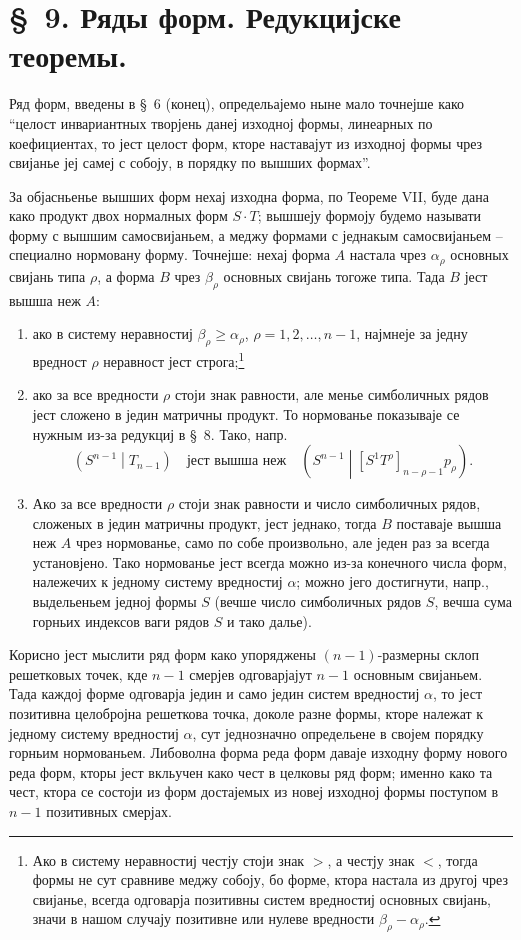 ﻿\documentclass[11pt]{article}
\newcommand{\pair}[2]{\left(#1\middle|#2\right)}
\begin{document}
\section*{\S\ 9. Ряды форм. Редукцијске теоремы.}

Ряд форм, введены в \S\ 6 (конец), определьајемо ныне мало точнејше како ``целост инвариантных творјень данеј изходној формы, линеарных по коефициентах, то јест целост форм, кторе наставајут из изходној формы чрез свијанье јеј самеј с собоју, в порядку по вышших формах''.

За објасньенье вышших форм нехај изходна форма, по Теореме VII, буде дана како продукт двох нормалных форм $S\cdot T$; вышшеју формоју будемо называти форму с вышшим самосвијаньем, а меджу формами с једнакым самосвијаньем -- специално нормовану форму. Точнејше: нехај форма $A$ настала чрез $\alpha_\rho$ основных свијань типа $\rho$, а форма $B$ чрез $\beta_\rho$ основных свијань тогоже типа. Тада $B$ јест вышша неж $A$:
\begin{enumerate}
\item ако в систему неравностиј $\beta_\rho\ge\alpha_\rho$, $\rho=1,2,\ldots,n-1$, најмнеје за једну вредност $\rho$ неравност јест строга;\footnote{Ако в систему неравностиј честју стоји знак $>$, а честју знак $<$, тогда формы не сут сравниве меджу собоју, бо форме, ктора настала из другој чрез свијанье, всегда одговарја позитивны систем вредностиј основных свијань, значи в нашом случају позитивне или нулеве вредности $\beta_\rho-\alpha_\rho$.}
\item ако за все вредности $\rho$ стоји знак равности, але менье симболичных рядов јест сложено в једин матричны продукт. То нормованье показываје се нужным из-за редукциј в \S\ 8. Тако, напр.
\[
\pair{S^{n-1}}{T_{n-1}}
\quad\text{јест вышша неж}\quad
\pair{S^{n-1}}{[S^1T^\rho]_{n-\rho-1}p_\rho}.
\]
\item Ако за все вредности $\rho$ стоји знак равности и число симболичных рядов, сложеных в једин матричны продукт, јест једнако, тогда $B$ поставаје вышша неж $A$ чрез нормованье, само по собе произвольно, але једен раз за всегда установјено. Тако нормованье јест всегда можно из-за конечного числа форм, належечих к једному систему вредностиј $\alpha$; можно јего достигнути, напр., выдельеньем једној формы $S$ (вечше число симболичных рядов $S$, вечша сума горньих индексов ваги рядов $S$ и тако далье).
\end{enumerate}
Корисно јест мыслити ряд форм како упоряджены $(n-1)$-размерны склоп решетковых точек, кде $n-1$ смерјев одговарјајут $n-1$ основным свијаньем. Тада каждој форме одговарја једин и само једин систем вредностиј $\alpha$, то јест позитивна целобројна решеткова точка, доколе разне формы, кторе належат к једному систему вредностиј $\alpha$, сут једнозначно определьене в својем порядку горньим нормованьем. Либоволна форма реда форм даваје изходну форму нового реда форм, кторы јест вкльучен како чест в целковы ряд форм; именно како та чест, ктора се состоји из форм достајемых из новеј изходној формы поступом в $n-1$ позитивных смерјах.
\end{document}
